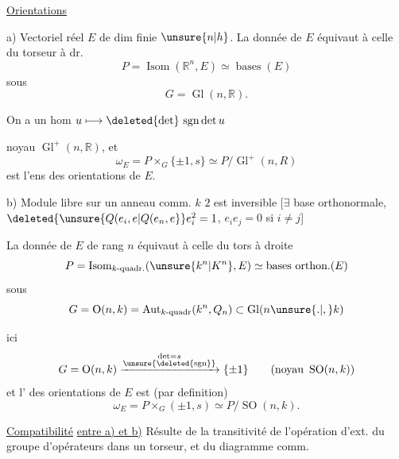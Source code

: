 \uline{Orientations}

a) Vectoriel réel $E$ de dim finie $\unsure{n|h}$. La donnée de $E$ équivaut à celle du torseur à dr.
\[
 P=\operatorname{Isom}(\mathbb R^n,E)\simeq\operatorname{bases}(E)
\]
sous
\[
 G=\operatorname{Gl}(n,\mathbb R).
\]

On a un hom
$u\longmapsto\deleted{\det}\,\operatorname{sgn}\det u$

noyau $\operatorname{Gl}^+(n,\mathbb R)$,
et
\[
 \omega_E=P\times_G\{\pm1,s\}\simeq P/\operatorname{Gl}^+(n,R)
\]
est l'ens des orientations de $E$.

b) Module  libre   sur un anneau comm. $k$  $2$ est inversible [$\exists$ base orthonormale, $\deleted{\unsure{Q(e_i,e|Q(e_n,e}} e_i^2=1$, $e_i e_j=0$ si $i\ne j$]

La donnée de $E$ de rang $n$ équivaut à celle du tors à droite
\[
 P=\operatorname{Isom}_{k\text{-quadr.}}(\unsure{k^n|K^n},E)\simeq\text{bases orthon.}(E)
\]
sous
\[
 G=\operatorname{O}(n,k)=\operatorname{Aut}_{k\text{-quadr}}(k^n,Q_n)\subset\operatorname{Gl}(n\unsure{.|,}k)
\]

 ici
\[
 G=\operatorname{O}(n,k)\xrightarrow{\substack{\det=s\\\unsure{\deleted{\operatorname{sgn}}}}}\{\pm1\}\qquad(\text{noyau }\operatorname{SO}(n,k))
\]
et l' des orientations de $E$ est (par definition)
\[
 \omega_E=P\times_G(\pm1,s)\simeq P/\operatorname{SO}(n,k).
\]

\uline{Compatibilité} \uline{entre a) et b)} Résulte de la transitivité de l'opération d'ext. du groupe d'opérateurs dans un torseur, et du diagramme comm.
